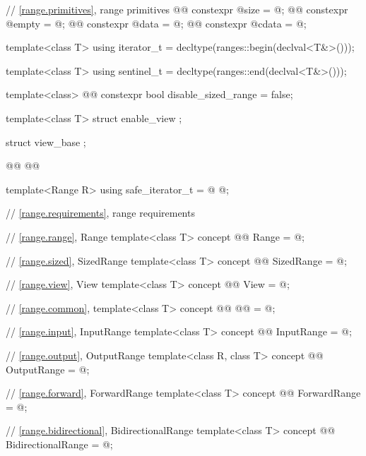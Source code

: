 {\begin{codeblock}
{{{      // \ref{range.primitives}, range primitives
      @@ constexpr @\unspec@ size = @\unspecnc@;
      @@ constexpr @\unspec@ empty = @\unspecnc@;
      @@ constexpr @\unspec@ data = @\unspecnc@;
      @@ constexpr @\unspec@ cdata = @\unspecnc@;
    }

    template<class T>
    using iterator_t = decltype(ranges::begin(declval<T&>()));

    template<class T>
    using sentinel_t = decltype(ranges::end(declval<T&>()));

    template<class>
    @@ constexpr bool disable_sized_range = false;

    template<class T>
    struct enable_view { };

    struct view_base { };

    @@
    @@

    template<Range R>
    using safe_iterator_t = @ \oldtxt{\seebelownc}@;

    // \ref{range.requirements}, range requirements

    // \ref{range.range}, Range
    template<class T>
    concept @@ Range = @\seebelownc@;

    // \ref{range.sized}, SizedRange
    template<class T>
    concept @@ SizedRange = @\seebelownc@;

    // \ref{range.view}, View
    template<class T>
    concept @@ View = @\seebelownc@;

    // \ref{range.common}, 
    template<class T>
    concept @@ @@ = @\seebelownc@;

    // \ref{range.input}, InputRange
    template<class T>
    concept @@ InputRange = @\seebelownc@;

    // \ref{range.output}, OutputRange
    template<class R, class T>
    concept @@ OutputRange = @\seebelownc@;

    // \ref{range.forward}, ForwardRange
    template<class T>
    concept @@ ForwardRange = @\seebelownc@;

    // \ref{range.bidirectional}, BidirectionalRange
    template<class T>
    concept @@ BidirectionalRange = @\seebelownc@;

}}
\end{codeblock}}
